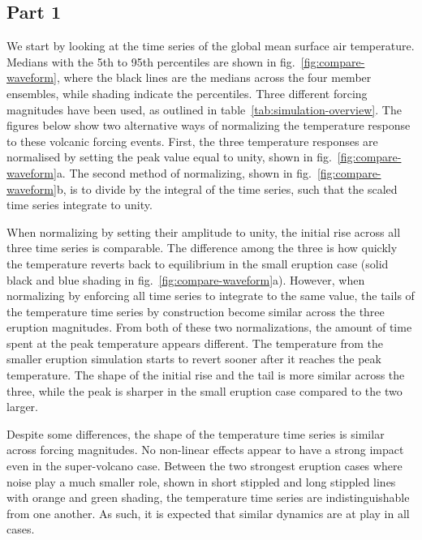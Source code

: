 \documentclass{ametsocV6.1}
\begin{document}
\subsection{Part 1}

We start by looking at the time series of the global mean surface air temperature.
Medians with the 5th to 95th percentiles are shown in fig.~\ref{fig:compare-waveform},
where the black lines are the medians across the four member ensembles, while shading
indicate the percentiles. Three different forcing magnitudes have been used, as outlined
in table~\ref{tab:simulation-overview}. The figures below show two alternative ways of
normalizing the temperature response to these volcanic forcing events. First, the three
temperature responses are normalised by setting the peak value equal to unity, shown in
fig.~\ref{fig:compare-waveform}a. The second method of normalizing, shown in
fig.~\ref{fig:compare-waveform}b, is to divide by the integral of the time series, such
that the scaled time series integrate to unity.

When normalizing by setting their amplitude to unity, the initial rise across all three
time series is comparable. The difference among the three is how quickly the temperature
reverts back to equilibrium in the small eruption case (solid black and blue shading in
fig.~\ref{fig:compare-waveform}a). However, when normalizing by enforcing all time
series to integrate to the same value, the tails of the temperature time series by
construction become similar across the three eruption magnitudes. From both of these two
normalizations, the amount of time spent at the peak temperature appears different. The
temperature from the smaller eruption simulation starts to revert sooner after it
reaches the peak temperature. The shape of the initial rise and the tail is more similar
across the three, while the peak is sharper in the small eruption case compared to the
two larger.

Despite some differences, the shape of the temperature time series is similar across
forcing magnitudes. No non-linear effects appear to have a strong impact even in the
super-volcano case. Between the two strongest eruption cases where noise play a much
smaller role, shown in short stippled and long stippled lines with orange and green
shading, the temperature time series are indistinguishable from one another. As such, it
is expected that similar dynamics are at play in all cases.

\end{document}
